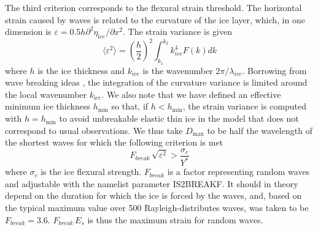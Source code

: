 \noindent
The third criterion corresponds to the flexural strain threshold. The horizontal 
strain caused by waves is related to 
the curvature of the ice layer, which, in one dimension is 
$\varepsilon = 0.5 h \partial ^2 \eta_{\mathrm ice} / \partial x^2$. 
The strain variance is given 
\begin{equation}
\langle\varepsilon^2\rangle = \left( \frac{h}{2} \right) ^2   \int_{k_1}^{k_2} k_{ice}^4 F(k)dk 
\label{strain_sign}
\end{equation}
where $h$ is the ice thickness and $k_{ice}$ is the wavenumber $2 \pi /\lambda_{ice}$. 
Borrowing from wave breaking 
ideas \citep{art:BBY00}, the integration of the curvature variance is limited around 
the local wavenumber $k_{\mathrm ice}$. 
We also note that we have defined an effective minimum ice thickness $h_{\min}$ so that, 
if $h<h_{\min}$, the strain 
variance is computed with $h=h_{\min}$ to avoid unbreakable elastic thin ice in the model 
that does not correspond to 
usual observations. We thus take $D_{\max}$ to be half the wavelength of the shortest 
waves for which the following criterion is met 
\begin{equation}
F_{break}\, \sqrt{\varepsilon^2} > \frac{\sigma_c}{Y^*} 
\label{strain_crit}
\end{equation}
where $\sigma_c$ is the ice flexural strength. $F_{break}$ is a factor representing random waves and adjustable with 
the namelist parameter  {\code IS2BREAKF}. It should in theory depend on the duration for which the ice is forced by the 
waves, and, based on the typical maximum value over 500 Rayleigh-distributes waves, was taken to be $F_{break}=3.6$. 
$F_{break} \, E_s$ is thus the maximum strain for random waves. \\ 



